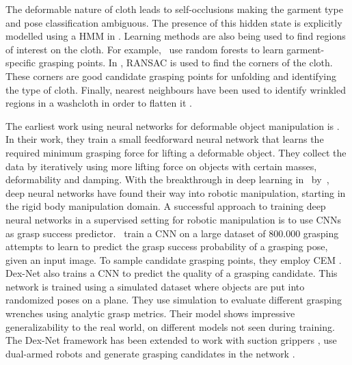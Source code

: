 \documentclass[\home/main.tex]{subfiles}
\begin{document}
The deformable nature of cloth leads to self-occlusions making the garment type and pose classification ambiguous. The presence of this hidden state is explicitly modelled using a \gls{HMM} in \autocite{Cusumano2011}.  Learning methods are also being used to find regions of interest on the cloth. For example,~\textcite{Doumanoglou2016} use random forests to learn garment-specific grasping points. In \autocite{Maitin2010}, RANSAC \autocite{RANSAC} is used to find the corners of the cloth. These corners are good candidate grasping points for unfolding and identifying the type of cloth. Finally, nearest neighbours have been used to identify wrinkled regions in a washcloth in order to flatten it \autocite{Willimon2011}.

The earliest work using neural networks for deformable object manipulation is \autocite{Howard2000}. In their work, they train a small feedforward neural network that learns the required minimum grasping force for lifting a deformable object. They collect the data by iteratively using more lifting force on objects with certain masses, deformability and damping. 
With the breakthrough in deep learning in~\citeyear{Krizhevsky2012} by~\textcite{Krizhevsky2012}, deep neural networks have found their way into robotic manipulation, starting in the rigid body manipulation domain. A successful approach to training deep neural networks in a supervised setting for robotic manipulation is to use \glspl{CNN} as grasp success predictor.~\textcite{Levine2016} train a \gls{CNN} on a large dataset of $800.000$ grasping attempts to learn to predict the grasp success probability of a grasping pose, given an input image. To sample candidate grasping points, they employ CEM \autocite{CEM}. Dex-Net \autocite{dexnet2} also trains a \gls{CNN} to predict the quality of a grasping candidate. This network is trained using a simulated dataset where objects are put into randomized poses on a plane. They use simulation to evaluate different grasping wrenches using analytic grasp metrics. Their model shows impressive generalizability to the real world, on different models not seen during training. The Dex-Net framework has been extended to work with suction grippers \autocite{dexnet3}, use dual-armed robots \autocite{dexnet4} and generate grasping candidates in the network \autocite{Satish2019}.
\end{document}
